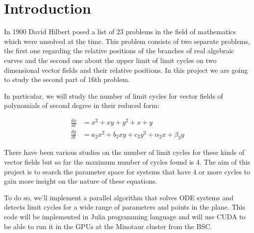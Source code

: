 
\section{Introduction}%
\label{sec:intro}

In 1900 David Hilbert posed a list of 23 problems in the field of mathematics
which were unsolved at the time.  This problem consists of two separate
problems, the first one regarding the relative positions of the branches of real
algebraic curves and the second one about the upper limit of limit cycles on two
dimensional vector fields and their relative positions. In this project we are
going to study the second part of 16th problem.

In particular, we will study the number of limit cycles for vector fields of
polynomials of second degree in their reduced form:

\begin{align}
    \frac{dx}{dt} &= x^2 + xy + y^2 + x + y \\
    \frac{dy}{dt} &= a_2x^2 + b_2xy + c_2y^2 + \alpha_2x + \beta_2y
\end{align}

There have been various studies on the number of limit cycles for these kinds of
vector fields but so far the maximum number of cycles found is 4. The aim of
this project is to search the parameter space for systems that have 4 or more
cycles to gain more insight on the nature of these equations.

To do so, we'll implement a parallel algorithm that solves ODE systems and
detects limit cycles for a wide range of parameters and points in the plane.
This code will be implemented in Julia programming language and will use CUDA
to be able to run it in the GPUs at the Minotaur cluster from the BSC.
